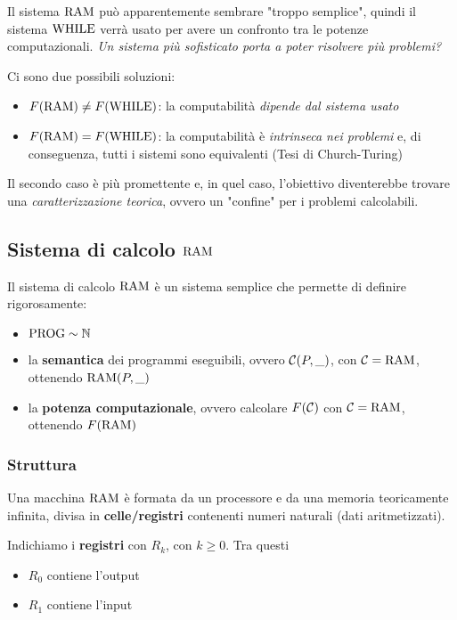 Il sistema $\text{RAM}$ può apparentemente sembrare "troppo semplice", quindi il sistema $\text{WHILE}$ verrà usato per avere un confronto tra le potenze computazionali. \textit{Un sistema più sofisticato porta a poter risolvere più problemi?}

Ci sono due possibili soluzioni: 
\begin{itemize}
	\item $F(\text{RAM}) \neq F(\text{WHILE})$: la computabilità \textit{dipende dal sistema usato}
    
	\item $F(\text{RAM}) = F(\text{WHILE})$: la computabilità è \textit{intrinseca nei problemi} e, di conseguenza, tutti i sistemi sono equivalenti (Tesi di Church-Turing)
\end{itemize}

Il secondo caso è più promettente e, in quel caso, l'obiettivo diventerebbe trovare una \textit{caratterizzazione teorica}, ovvero un "confine" per i problemi calcolabili.

\subsection{Sistema di calcolo $\text{RAM}$}

Il sistema di calcolo $\text{RAM}$ è un sistema semplice che permette di definire rigorosamente: 
\begin{itemize}
	\item $\text{PROG} \sim \mathbb{N}$

	\item la \textbf{semantica} dei programmi eseguibili, ovvero $\mathcal{C}(P,\_)$, con $\mathcal{C} = \text{RAM}$, ottenendo $\text{RAM} (P,\_)$

	\item la \textbf{potenza computazionale}, ovvero calcolare $F(\mathcal{C})$ con $\mathcal{C} = \text{RAM}$, ottenendo $F(\text{RAM})$
\end{itemize}

\subsubsection{Struttura}

Una macchina $\text{RAM}$ è formata da un processore e da una memoria teoricamente infinita, divisa in \textbf{celle/registri} contenenti numeri naturali (dati aritmetizzati).

Indichiamo i \textbf{registri} con $R_k$, con $k \geq 0$. Tra questi 
\begin{itemize}
	\item $R_0$ contiene l'output
    
	\item $R_1$ contiene l'input
\end{itemize}

